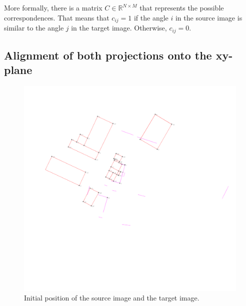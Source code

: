             More formally, there is a matrix $C \in \mathbb{R}^{N \times M}$ that represents the possible correspondences.
            That means that $c_{ij} = 1$ if the angle $i$ in the source image is similar to the angle $j$ in the target image.
            Otherwise, $c_{ij} = 0$.

        \subsection{Alignment of both projections onto the xy-plane}
            \label{sub:Alignment of both projections onto the xy-plane}

            \begin{figure}[H]
                \includegraphics[width=\textwidth]{images/solution_images/2D_XY_initial_inverted.png}
                \caption{Initial position of the source image and the target image.}
                \label{fig:2D_initial}
            \end{figure}

